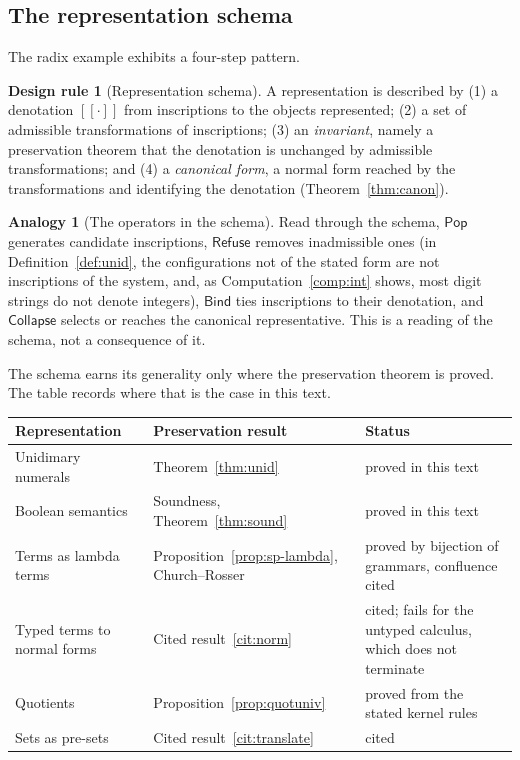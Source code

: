\documentclass[11pt]{article}
\newcommand{\Pop}{\mathsf{Pop}}
\newcommand{\Refuse}{\mathsf{Refuse}}
\newcommand{\Bind}{\mathsf{Bind}}
\newcommand{\Coll}{\mathsf{Collapse}}
\newcommand{\sem}[1]{[\![#1]\!]}
\theoremstyle{definition}
\newtheorem{designrule}[definition]{Design rule}
\newtheorem{analogy}[definition]{Analogy}
\theoremstyle{plain}
\theoremstyle{remark}
\begin{document}
\subsection{The representation schema}

The radix example exhibits a four-step pattern.

\begin{designrule}[Representation schema]\label{dr:schema}
A representation is described by (1) a denotation $\sem{\cdot}$ from inscriptions to the objects represented; (2) a set of admissible transformations of inscriptions; (3) an \emph{invariant}, namely a preservation theorem that the denotation is unchanged by admissible transformations; and (4) a \emph{canonical form}, a normal form reached by the transformations and identifying the denotation (Theorem~\ref{thm:canon}).
\end{designrule}

\begin{analogy}[The operators in the schema]\label{an:schema-ops}
Read through the schema, $\Pop$ generates candidate inscriptions, $\Refuse$ removes inadmissible ones (in Definition~\ref{def:unid}, the configurations not of the stated form are not inscriptions of the system, and, as Computation~\ref{comp:int} shows, most digit strings do not denote integers), $\Bind$ ties inscriptions to their denotation, and $\Coll$ selects or reaches the canonical representative. This is a reading of the schema, not a consequence of it.
\end{analogy}

The schema earns its generality only where the preservation theorem is proved. The table records where that is the case in this text.

\begin{center}
\small
\begin{tabular}{@{}p{}p{}p{}@{}}
\toprule
Representation & Preservation result & Status\\
\midrule
Unidimary numerals & Theorem~\ref{thm:unid} & proved in this text\\
Boolean semantics & Soundness, Theorem~\ref{thm:sound} & proved in this text\\
Terms as lambda terms & Proposition~\ref{prop:sp-lambda}, Church--Rosser & proved by bijection of grammars, confluence cited\\
Typed terms to normal forms & Cited result~\ref{cit:norm} & cited; fails for the untyped calculus, which does not terminate\\
Quotients & Proposition~\ref{prop:quotuniv} & proved from the stated kernel rules\\
Sets as pre-sets & Cited result~\ref{cit:translate} & cited\\
\bottomrule
\end{tabular}
\end{center}
\end{document}
